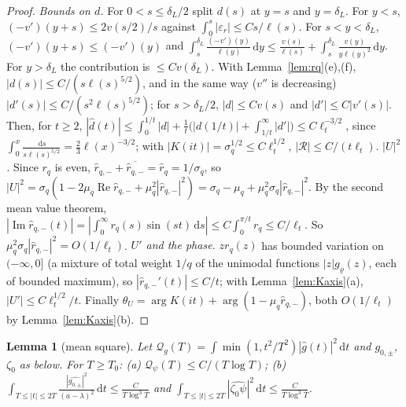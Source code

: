 \documentclass[11pt]{amsart}
\newcommand{\dd}{\,\mathrm{d}}
\newcommand{\eps}{\varepsilon}
\DeclareMathOperator{\re}{Re}
\DeclareMathOperator{\im}{Im}
\newtheorem{lemma}[theorem]{Lemma}
\theoremstyle{definition}
\theoremstyle{remark}
\numberwithin{equation}{section}
\begin{document}
\begin{proof}
\emph{Bounds on $d$.} For $0<s\le\delta_L/2$ split $d(s)$ at $y=s$ and $y=\delta_L$. For $y<s$, $(-v')(y+s)\le2v(s/2)/s$ against $\int_0^s|\eps_r|\le Cs/\ell(s)$. For $s<y<\delta_L$, $(-v')(y+s)\le(-v')(y)$ and $\int_s^{\delta_L}\frac{(-v')(y)}{\ell(y)}\dd y\le\frac{v(s)}{\ell(s)}+\int_s^{\delta_L}\frac{v(y)}{y\ell(y)^2}\dd y$. For $y>\delta_L$ the contribution is $\le Cv(\delta_L)$. With Lemma~\ref{lem:rq}(e),(f), $|d(s)|\le C/(s\ell(s)^{5/2})$, and in the same way ($v''$ is decreasing) $|d'(s)|\le C/(s^2\ell(s)^{5/2})$; for $s>\delta_L/2$, $|d|\le Cv(s)$ and $|d'|\le C|v'(s)|$. Then, for $t\ge2$, $|\hat d(t)|\le\int_0^{1/t}|d|+\frac1t\bigl(|d(1/t)|+\int_{1/t}^\infty|d'|\bigr)\le C\ell_t^{-3/2}$, since $\int_0^x\frac{\dd s}{s\ell(s)^{5/2}}=\frac23\ell(x)^{-3/2}$; with $|K(it)|=\sigma_q^{1/2}\le C\ell_t^{1/2}$, $|\mathcal R|\le C/(t\ell_t)$.
\emph{$|U|^2$.} Since $r_q$ is even, $\hat r_{q,-}+\overline{\hat r_{q,-}}=\hat r_q=1/\sigma_q$, so $|U|^2=\sigma_q(1-2\mu_q\re\hat r_{q,-}+\mu_q^2|\hat r_{q,-}|^2)=\sigma_q-\mu_q+\mu_q^2\sigma_q|\hat r_{q,-}|^2$. By the second mean value theorem, $|\im\hat r_{q,-}(t)|=|\int_0^\infty r_q(s)\sin(st)\dd s|\le C\int_0^{\pi/t}r_q\le C/\ell_t$. So $\mu_q^2\sigma_q|\hat r_{q,-}|^2=O(1/\ell_t)$.
\emph{$U'$ and the phase.} $zr_q(z)$ has bounded variation on $(-\infty,0]$ (a mixture of total weight $1/q$ of the unimodal functions $|z|g_\varrho(z)$, each of bounded maximum), so $|\hat r_{q,-}'(t)|\le C/t$; with Lemma~\ref{lem:Kaxis}(a), $|U'|\le C\ell_t^{1/2}/t$. Finally $\theta_U=\arg K(it)+\arg(1-\mu_q\hat r_{q,-})$, both $O(1/\ell_t)$ by Lemma~\ref{lem:Kaxis}(b).
\end{proof}

\begin{lemma}[mean square]\label{lem:ms}
Let $\mathcal Q_g(T)=\int\min(1,t^2/T^2)|\hat g(t)|^2\dd t$ and $g_{0,\pm}$, $\zeta_0$ as below. For $T\ge T_0$: (a) $\mathcal Q_\psi(T)\le C/(T\log T)$; (b) $\int_{T\le|t|\le2T}\frac{|\widehat{g_{0,\pm}}|^2}{(a-\lambda)^2}\dd t\le\frac C{T\log^3T}$ and $\int_{T\le|t|\le2T}|\widehat{\zeta_0\psi}|^2\dd t\le\frac C{T\log^3T}$.
\end{lemma}
\end{document}
